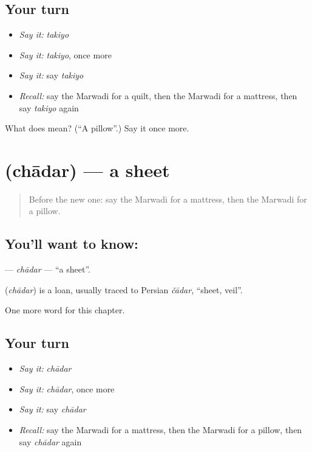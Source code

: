 \subsection*{Your turn}
\begin{itemize}
\raggedright
  \item \emph{Say it:} \emph{takiyo}
  \item \emph{Say it:} \emph{takiyo}, once more
  \item \emph{Say it:} say \emph{takiyo}
  \item \emph{Recall:} say the Marwadi for a quilt, then the Marwadi for a mattress, then say \emph{takiyo} again
\end{itemize}

\begin{tcolorbox}[breakable,colback=teal!4,colframe=teal!35!black,title={Before you move on}]
What does  mean? (\textquotedblleft{}A pillow\textquotedblright{}.) Say it once more.
\end{tcolorbox}
\section[\texorpdfstring{\mw{चादर} (chādar)}{चादर (chādar)}]{ (chādar) — a sheet}

\label{lesson:MW-C123-chadar}



\begin{quote}
Before the new one: say the Marwadi for a mattress, then the Marwadi for a pillow.
\end{quote}

\subsection*{You'll want to know: }
\textbf{} — \emph{chādar} — \textquotedblleft{}a sheet\textquotedblright{}.

\begin{cousinweb}
\textbf{} (\emph{chādar}) is a loan, usually traced to Persian \emph{čādar}, \textquotedblleft{}sheet, veil\textquotedblright{}.
\end{cousinweb}

\begin{grammarlens}[title={What you've built}]
One more word for this chapter.
\end{grammarlens}

\subsection*{Your turn}
\begin{itemize}
\raggedright
  \item \emph{Say it:} \emph{chādar}
  \item \emph{Say it:} \emph{chādar}, once more
  \item \emph{Say it:} say \emph{chādar}
  \item \emph{Recall:} say the Marwadi for a mattress, then the Marwadi for a pillow, then say \emph{chādar} again
\end{itemize}

